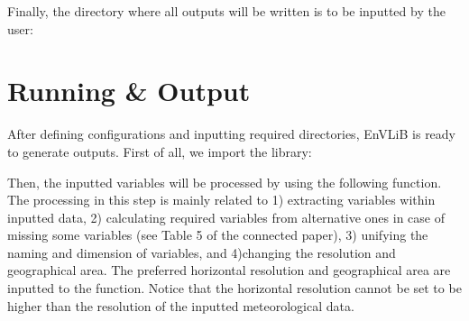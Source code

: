 \documentclass[a4paper,11pt,english]{sphinxmanual}
\begin{document}
\begin{sphinxVerbatim}[commandchars=\\\{\}]
 \PYG{p}{[}\PYG{p}{]}        
\end{sphinxVerbatim}

\sphinxAtStartPar
Finally, the directory where all outputs will be written is to be inputted by the user:

\begin{sphinxVerbatim}[commandchars=\\\{\}]
      
\end{sphinxVerbatim}


\section{Running \& Output}
\label{\detokenize{gStarted:running-output}}
\sphinxAtStartPar
After defining configurations and inputting required directories, EnVLiB is ready to generate outputs. First of all, we import the library:

\begin{sphinxVerbatim}[commandchars=\\\{\}]
 
   
\end{sphinxVerbatim}

\sphinxAtStartPar
Then, the inputted variables will be processed by using the following function. The processing in this step is mainly related to 1) extracting variables within inputted data, 2) calculating required variables from alternative ones in case of missing some variables (see Table 5 of the connected paper), 3) unifying the naming and dimension of variables, and 4)changing the resolution and geographical area.
The preferred horizontal resolution and geographical area are inputted to the function. Notice that the horizontal resolution cannot be set to be higher than the resolution of the inputted meteorological data.

\begin{sphinxVerbatim}[commandchars=\\\{\}]
        
\end{sphinxVerbatim}
\end{document}
